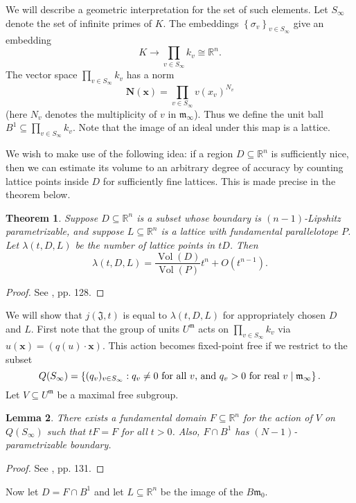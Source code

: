 \documentclass{amsart}
\def\RR{{\mathbb R}}
\def\mf{\mathfrak}
\def\RR{\mathbb{R}}   %
\def\bN{\textbf{N}}
\newcommand\Vol{\operatorname{Vol}}
\newtheorem{theorem}{Theorem}[section]
\newtheorem{lemma}[theorem]{Lemma}
\theoremstyle{definition}
\theoremstyle{remark}
\begin{document}
We will describe a geometric interpretation for the set of such
elements. Let $S_\infty$ denote the set of infinite primes of $K$.
The embeddings $\left\{ \sigma_v \right\}_{v \in S_\infty}$ give
an embedding
\[
K \to \prod_{v \in S_\infty} k_v \cong \RR^n.
\]
The vector space $\prod_{v \in S_\infty} k_v$ has a norm
\[
\bN(\mathbf{x}) = \prod_{v \in S_\infty} v(x_v)^{N_v}
\]
(here $N_v$ denotes the multiplicity of $v$ in $\mf{m}_\infty$).
Thus we define the unit ball $B^1 \subseteq \prod_{v \in S_\infty}
k_v$. Note that the image of an ideal under this map is a lattice.

We wish to make use of the following idea: if a region $D
\subseteq \RR^n$ is sufficiently nice, then we can estimate its
volume to an arbitrary degree of accuracy by counting lattice
points inside $D$ for sufficiently fine lattices.  This is made
precise in the theorem below.
\begin{theorem}
\label{lattice} Suppose $D \subseteq \RR^n$ is a subset whose
boundary is $(n-1)$-Lipshitz parametrizable, and suppose $L
\subseteq \RR^n$ is a lattice with fundamental parallelotope
$P$.  Let $\lambda(t, D, L)$ be the number of lattice points in
$tD$.  Then
\[
\lambda(t, D, L) = \frac{\Vol (D)}{\Vol (P)} t^n + O(t^{n-1}).
\]
\end{theorem}
\begin{proof}
See \cite{lang}, pp. 128.
\end{proof}
We will show that $j(\mf{J}, t)$ is equal to $\lambda(t, D, L)$
for appropriately chosen $D$ and $L$.  First note that the group
of units $U^\mf{m}$ acts on $\prod_{v \in S_\infty} k_v$ via
$u(\mathbf{x}) = (q(u) \cdot \mathbf{x})$.  This action becomes
fixed-point free if we restrict to the subset
\[
Q(S_\infty) = \left\{ (q_v)_{v \in S_\infty} : q_v \neq 0
\textnormal{ for all } v \textnormal{, and } q_v > 0 \textnormal{
for real } v \mid \mf{m}_\infty \right\}.
\]
Let $V \subseteq U^\mf{m}$ be a maximal free subgroup.
\begin{lemma}
There exists a fundamental domain $F \subseteq \RR^n$ for the
action of $V$ on $Q(S_\infty)$ such that $tF = F$ for all $t
> 0$.  Also, $F \cap B^1$ has $(N-1)$-parametrizable boundary.
\end{lemma}
\begin{proof}
See \cite{lang}, pp. 131.
\end{proof}

Now let $D = F \cap B^1$ and let $L \subseteq \RR^n$ be the image
of the $B \mf{m}_0$.
\end{document}
